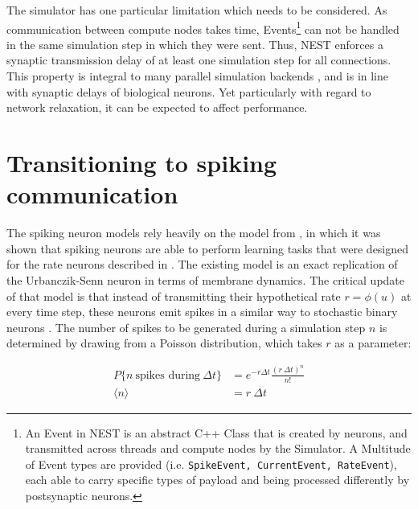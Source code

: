 The simulator has one particular limitation which needs to be considered. As communication between compute nodes takes
time, Events\footnote{An Event in NEST is an abstract C++ Class that is created by neurons, and transmitted across
threads and compute nodes by the Simulator. A Multitude of Event types are provided (i.e. \texttt{SpikeEvent,
CurrentEvent, RateEvent}), each able to carry specific types of payload and being processed differently by postsynaptic
neurons.} can not be handled in the same simulation step in which they were sent. Thus, NEST enforces a synaptic
transmission delay of at least one simulation step for all connections. This property is integral to many parallel
simulation backends \citep{davies2018loihi,Hines1997,Schepper2022}, and is in line with synaptic delays of biological
neurons. Yet particularly with regard to network relaxation, it can be expected to affect performance.


\section{Transitioning to spiking communication}

The spiking neuron models rely heavily on the model from \citep{Stapmanns2021}, in which it was shown that spiking
neurons are able to perform learning tasks that were designed for the rate neurons described in
\cite{urbanczik2014learning}. The existing model is an exact replication of the Urbanczik-Senn neuron in terms of
membrane dynamics. The critical update of that model is that instead of transmitting their hypothetical rate $r =
\phi(u)$ at every time step, these neurons emit spikes in a similar way to stochastic binary neurons
\citep{Ginzburg1994}. The number of spikes to be generated during a simulation step $n$ is determined by drawing from a
Poisson distribution, which takes $r$ as a parameter:

\begin{align}
  P\{\textit{n} \ \text{spikes during} \ \Delta t\} & = e^{-r \Delta t} \frac{(r \ \Delta t) ^ n}{n!}\label{eq-pr-n-spikes} \\
  \langle \textit{n} \rangle                        & = r \ \Delta t \label{eq-n-spikes}
\end{align}


